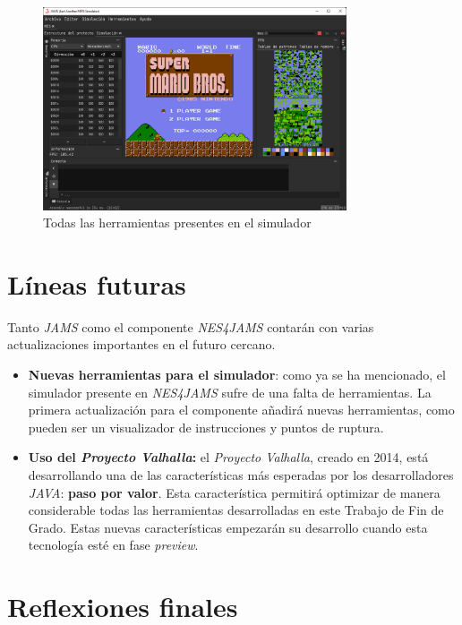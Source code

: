\begin{figure}[h]
    \centering
    \includegraphics[width=0.8\textwidth]{images/conclusions/nes-simulator-tools}
    \caption{Todas las herramientas presentes en el simulador}
    \label{fig:nes-conclusions-tools}
\end{figure}

\section{Líneas futuras}\label{sec:líneas-futuras}

Tanto \textit{JAMS} como el componente \textit{NES4JAMS}
contarán con varias actualizaciones importantes en
el futuro cercano.

\begin{itemize}
    \item \textbf{Nuevas herramientas para el simulador}:
    como ya se ha mencionado, el simulador presente en
    \textit{NES4JAMS} sufre de una falta de herramientas.
    La primera actualización para el componente añadirá
    nuevas herramientas, como pueden ser un visualizador
    de instrucciones y puntos de ruptura.
    \item \textbf{Uso del \textit{Proyecto Valhalla}:} el
    \textit{Proyecto Valhalla}\cite{PROJECT_VALHALLA}, creado en 2014,
    está desarrollando una de las características más esperadas
    por los desarrolladores \textit{JAVA}: \textbf{paso por valor}.
    Esta característica permitirá optimizar de manera considerable
    todas las herramientas desarrolladas en este Trabajo de Fin
    de Grado.
    Estas nuevas características empezarán su desarrollo cuando esta
    tecnología esté en fase \textit{preview}.
\end{itemize}

\section{Reflexiones finales}\label{sec:reflexiones-finales}


